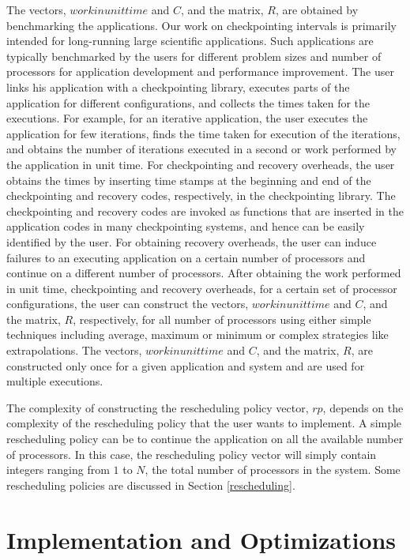 \documentclass[conference,10pt]{IEEEtran}
\begin{document}
The vectors, $workinunittime$ and $C$, and the matrix, $R$, are
obtained by benchmarking the applications. Our work on checkpointing
intervals is primarily intended for long-running large scientific
applications. Such applications are typically benchmarked by the users
for different problem sizes and number of processors for application
development and performance improvement. The user links his
application with a checkpointing library, executes parts of the application for
different configurations, and collects the times taken for the
executions. For example, for an iterative application, the user executes
the application for few iterations, finds the time taken for execution
of the iterations, and obtains the number of iterations executed in a
second or work performed by the application in unit time.
For checkpointing and recovery overheads, the user
obtains the times by inserting time stamps at the beginning and end of
the checkpointing and recovery codes, respectively, in the
checkpointing library. The checkpointing and recovery codes are
invoked as functions that are inserted in the application codes in
many checkpointing
systems\cite{fernandez-mobilempi-ppopp06,vadhiyar-srs-ppl2003}, and
hence can be easily identified by the user. For obtaining recovery
overheads, the user can induce failures to an executing application on
a certain number of processors and continue on a different number of
processors. After obtaining the work performed in unit time,
checkpointing and recovery overheads, for a certain set of processor
configurations, the user can construct the vectors, $workinunittime$
and $C$, and the matrix, $R$, respectively, for all number of
processors using either simple techniques including average, maximum
or minimum or complex strategies like extrapolations. The vectors,
$workinunittime$ and $C$, and the matrix, $R$, are constructed only
once for a given application and system and are used for multiple
executions.

The complexity of constructing the rescheduling policy vector, $rp$,
depends on the complexity of the rescheduling policy that the user
wants to implement. A simple rescheduling policy can be to continue
the application on all the available number of processors. In this
case, the rescheduling policy vector will simply contain integers ranging
from $1$ to $N$, the total number of processors in the system. Some
rescheduling policies are discussed in Section \ref{rescheduling}.

\section{Implementation and Optimizations}
\label{impop}
\end{document}
